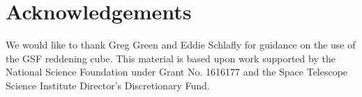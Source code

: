 \section{Acknowledgements}

We would like to thank Greg Green and Eddie Schlafly for guidance on the use of the GSF reddening cube.
This material is based upon work supported by the National Science Foundation under Grant No. 1616177 and the Space Telescope Science Institute Director's Discretionary Fund. 

